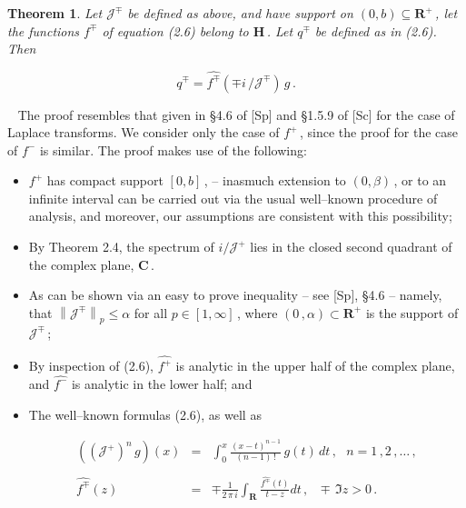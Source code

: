 \documentclass[11pt]{article}
\newtheorem{Theorem}{Theorem}[section]
\newenvironment{Proof}
{\bigskip\noindent{\bf Proof.}~\rm}{\bigskip}
\begin{document}
  \begin{Theorem}%
    \label{theorem:2.5}
Let ${\mathcal J}^\mp$ be defined as above, and have support on $(0,b)
\subseteq {\mathbf R}^+$\,, let the functions $f^\mp$ of equation
(2.6) belong to ${\mathbf H}$\,.  Let $q^\mp$ be defined as in
(2.6).  Then
 
 \begin{equation}%
 q^\mp = \widehat{f^\mp}\left(\mp i\,/{\mathcal J}^\mp\right)\,g\,.
\label{equation:2.10}
 \end{equation}

 \end{Theorem}

 \begin{Proof} The proof resembles that given in \S 4.6 of [Sp] and
   \S1.5.9 of [Sc] for the case of Laplace transforms. We consider
   only the case of $f^+$\,, since the proof for the case of $f^-$ is
   similar.     The proof makes use of the following:
 \begin{itemize}
   \item $f^+$ has compact support $[0,b]$\,, -- inasmuch
       extension to $(0,\beta)$\,, or to an infinite interval can be
       carried out via the usual well--known procedure of analysis,
       and moreover, our assumptions are consistent with this possibility;
   \item By Theorem 2.4, the spectrum of $i/{\mathcal J}^+$ lies in
     the closed second quadrant of the complex plane, ${\mathbf C}$\,.
   \item As can be shown via an easy to prove inequality -- see
       [Sp], \S4.6 -- namely, that $\left\|{\mathcal
         J}^\mp\right\|_p \leq \alpha$ for all $p \in [1,\infty]$\,,
       where $(0\,,\alpha) \subset {\mathbf R}^+$ is the support of
       ${\mathcal J}^\mp$\,;
   \item By inspection of (2.6), $\widehat{f^+}$ is
     analytic in the upper half of the complex plane, and
      $\widehat{f^-}$ is analytic in the lower half; and
   \item The well--known formulas (2.6), as well as  

   \begin{equation} %
     \begin{array}{rcl}
          \displaystyle \left(\left({\mathcal J}^+\right)^n\,g\right)(x) & = & 
          \displaystyle \int_0^x 
          \frac{(x-t)^{n-1}}{(n-1)\,!} \, g(t) \, dt\,, \ \ \ n =
          1\,,2\,,\ldots\,,\\ 
           \\
          \widehat{f^\mp}(z)  & = & \displaystyle \mp
          \frac{1}{2\,\pi\,i} \int_{\mathbf R} 
          \frac{\widehat{f^\mp}(t)}{t - z} dt\,, \ \ \ \mp\,\Im z > 0\,.
     \end{array}
    \label{equation:2.11}
   \end{equation}
   

\end{itemize}
\end{Proof}
\end{document}
